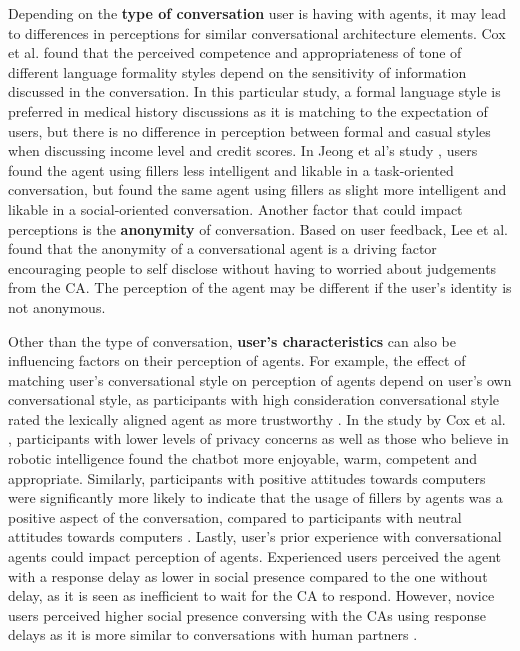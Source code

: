 \documentclass[sigconf,screen,review, anonymous]{acmart}
\newcommand{\cmt}[1]{}%
\begin{document}
Depending on the \textbf{type of conversation} user is having with agents, it may lead to differences in perceptions for similar conversational architecture elements. Cox et al. \cite{cox2022does}\cmt{[27]} found that the perceived competence and appropriateness of tone of different language formality styles depend on the sensitivity of information discussed in the conversation. In this particular study, a formal language style is preferred in medical history discussions as it is matching to the expectation of users, but there is no difference in perception between formal and casual styles when discussing income level and credit scores. In Jeong et al's study \cite{jeong2019exploring}\cmt{[10]}, users found the agent using fillers less intelligent and likable in a task-oriented conversation, but found the same agent using fillers as slight more intelligent and likable in a social-oriented conversation. Another factor that could impact perceptions is the \textbf{anonymity} of conversation. Based on user feedback, Lee et al. \cite{lee2020hear}\cmt{[23]} found that the anonymity of a conversational agent is a driving factor encouraging people to self disclose without having to worried about judgements from the CA. The perception of the agent may be different if the user's identity is not anonymous.

Other than the type of conversation, \textbf{user's characteristics} can also be influencing factors on their perception of agents. For example, the effect of matching user's conversational style on perception of agents depend on user's own conversational style, as participants with high consideration conversational style rated the lexically aligned agent as more trustworthy \cite{hoegen2019end}\cmt{[31]}. In the study by Cox et al. \cite{cox2022does}\cmt{[27]}, participants with lower levels of privacy concerns as well as those who believe in robotic intelligence found the chatbot more enjoyable, warm, competent and appropriate. Similarly, participants with positive attitudes towards computers were significantly more likely to indicate that the usage of fillers by agents was a positive aspect of the conversation, compared to participants with neutral attitudes towards computers \cite{pfeifer2009should}\cmt{[12]}. Lastly, user's prior experience with conversational agents could impact perception of agents. Experienced users perceived the agent with a response delay as lower in social presence compared to the one without delay, as it is seen as inefficient to wait for the CA to respond. However, novice users perceived higher social presence conversing with the CAs using response delays as it is more similar to conversations with human partners \cite{gnewuch2018faster}\cmt{[19]}.
\end{document}
